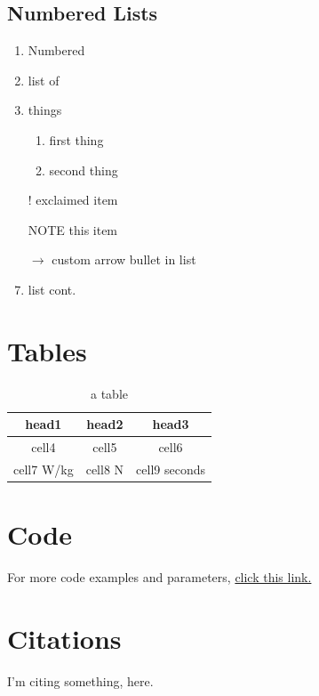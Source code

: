\documentclass{article}
\begin{document}
\subsection{Numbered Lists}
\begin{enumerate}
	\item Numbered
	\item list of 
	\item things
	\begin{enumerate}
		\item first thing
		\item second thing
	\end{enumerate}
	\item[!] exclaimed item
	\item[NOTE] this item
	\item[$\rightarrow$] custom arrow bullet in list
	\item list cont.
\end{enumerate}


\section{Tables}
\begin{table}[h]
\caption{a table}
\vspace{-3mm}
\begin{center}
\begin{tabular}{ ||c|c|c|| } 
 \hline
 \textbf{head1} & \textbf{head2} & \textbf{head3} \\ 
 \hline
 \hline
 cell4 & cell5 & cell6 \\ 
 \hline
 cell7 W/kg  & 
 cell8 N  & 
 cell9 seconds \\ 
 \hline
\end{tabular}
\end{center}
\end{table}


\section{Code}



\vspace{5mm}
For more code examples and parameters, \href{https://www.overleaf.com/learn/latex/Code_listing}{click this link.}


\vspace{0.5in}
\section{Citations}

I'm citing something, here. \cite{einstein}

\pagebreak
\printbibliography
\end{document}
